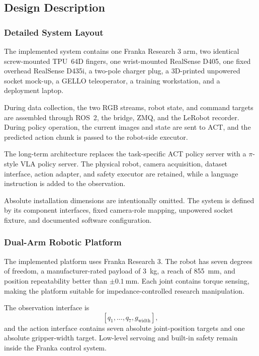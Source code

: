 \documentclass[12pt, letterpaper]{article}
\newcommand{\pistyle}{$\pi$-style}
\begin{document}
\subsection{Design Description}

\subsubsection{Detailed System Layout}

The implemented system contains one Franka Research 3 arm, two identical screw-mounted TPU~64D fingers, one wrist-mounted RealSense D405, one fixed overhead RealSense D435i, a two-pole charger plug, a 3D-printed unpowered socket mock-up, a GELLO teleoperator, a training workstation, and a deployment laptop.

During data collection, the two RGB streams, robot state, and command targets are assembled through ROS~2, the bridge, ZMQ, and the LeRobot recorder. During policy operation, the current images and state are sent to ACT, and the predicted action chunk is passed to the robot-side executor.

The long-term architecture replaces the task-specific ACT policy server with a \pistyle{} VLA policy server. The physical robot, camera acquisition, dataset interface, action adapter, and safety executor are retained, while a language instruction is added to the observation.

Absolute installation dimensions are intentionally omitted. The system is defined by its component interfaces, fixed camera-role mapping, unpowered socket fixture, and documented software configuration.

\subsubsection{Dual-Arm Robotic Platform}

The implemented platform uses Franka Research 3. The robot has seven degrees of freedom, a manufacturer-rated payload of 3~kg, a reach of 855~mm, and position repeatability better than \(\pm0.1~\mathrm{mm}\). Each joint contains torque sensing, making the platform suitable for impedance-controlled research manipulation.

The observation interface is
\[
[q_1,\ldots,q_7,g_{\mathrm{width}}],
\]
and the action interface contains seven absolute joint-position targets and one absolute gripper-width target. Low-level servoing and built-in safety remain inside the Franka control system.
\end{document}
